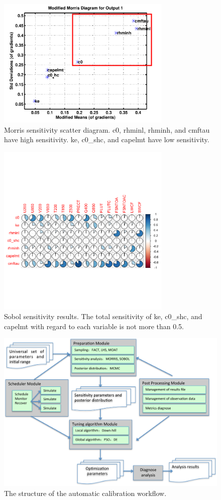 \documentclass[gmd, manuscript]{copernicus}
\begin{document}
\begin{figure}[t]
\includegraphics[width=8.3cm]{Morris}
\caption{Morris sensitivity scatter diagram. c0, rhminl, rhminh, and cmftau have high sensitivity. ke, c0\_shc, and capelmt have low sensitivity.}
\end{figure}

\begin{figure}[t]
\includegraphics[width=8.3cm]{Sobol}
\caption{Sobol sensitivity results. The total sensitivity of ke, c0\_shc, and capelmt with regard to each variable is not more than 0.5.}
\end{figure}

\begin{figure}[t]
\includegraphics[width=15.3cm]{workflow}
\caption{The structure of the automatic calibration workflow.}
\end{figure}
\end{document}
